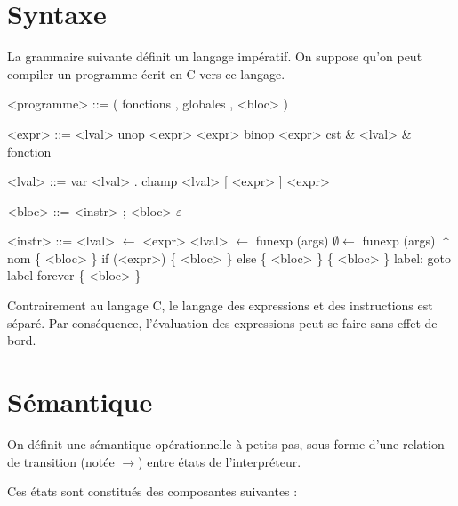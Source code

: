 \documentclass{article}
\begin{document}
\section{Syntaxe}

La grammaire suivante définit un langage impératif. On suppose qu'on peut
compiler un programme écrit en C vers ce langage.

\begin{grammarf}
<programme> ::= ( fonctions , globales , <bloc> )
\end{grammarf}
\begin{minipage}{0.4\textwidth}
\begin{grammarf}
    <expr> ::= <lval>
          \alt unop <expr>
          \alt <expr> binop <expr>
          \alt cst
          \alt \& <lval>
          \alt \& fonction

    <lval> ::= var
          \alt <lval> . champ
          \alt <lval> [ <expr> ]
          \alt * <expr>
\end{grammarf}
\end{minipage}
\begin{minipage}{0.4\textwidth}
\begin{grammarf}
     <bloc> ::= <instr> ; <bloc>
           \alt $ε$

    <instr> ::= <lval> $←$ <expr>
           \alt <lval> $←$ funexp (args)
           \alt  $∅ ←$ funexp (args)
           \alt $↑$ nom \{ <bloc> \}
           \alt if (<expr>) \{ <bloc> \} else \{ <bloc> \}
           \alt \{ <bloc> \} label:
           \alt goto label
           \alt forever \{ <bloc> \}
\end{grammarf}
\end{minipage}



Contrairement au langage C, le langage des expressions et des instructions est
séparé. Par conséquence, l'évaluation des expressions peut se faire sans effet de
bord.

\section{Sémantique}

On définit une sémantique opérationnelle à petits pas, sous forme d'une relation
de transition (notée $→$) entre états de l'interpréteur.

Ces états sont constitués des composantes suivantes :
\end{document}

